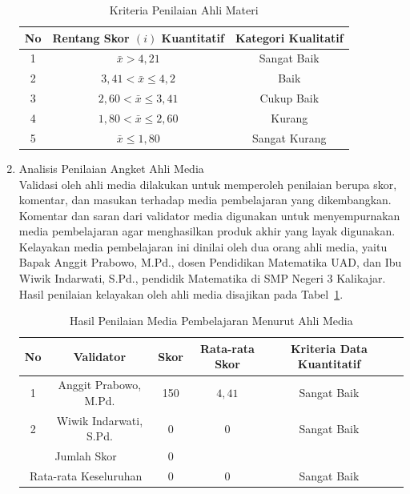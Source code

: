 \documentclass[12pt]{article}
\begin{document}
\begin{enumerate}
    \begin{table}[H]
        \centering
        \caption{Kriteria Penilaian Ahli Materi}
        \begin{tabular}{|c|c|c|}
            \hline
            \textbf{No} & \textbf{Rentang Skor \( (i) \) Kuantitatif} & \textbf{Kategori Kualitatif}\\
            \hline
            1 & \( \bar{x} > 4{,}21 \) & Sangat Baik\\
            2 & \( 3{,}41 < \bar{x} \leq 4{,}2 \) & Baik\\
            3 & \( 2{,}60 < \bar{x} \leq 3{,}41 \) & Cukup Baik\\
            4 & \( 1{,}80 < \bar{x} \leq 2{,}60 \) & Kurang\\
            5 & \( \bar{x} \leq 1{,80} \) & Sangat Kurang\\
            \hline 
        \end{tabular}
    \end{table}

    \item Analisis Penilaian Angket Ahli Media\\
    \hspace*{1cm}Validasi oleh ahli media dilakukan untuk memperoleh penilaian berupa skor, komentar, dan masukan terhadap media pembelajaran yang dikembangkan. Komentar dan saran dari validator media digunakan untuk menyempurnakan media pembelajaran agar menghasilkan produk akhir yang layak digunakan. Kelayakan media pembelajaran ini dinilai oleh dua orang ahli media, yaitu Bapak Anggit Prabowo, M.Pd., dosen Pendidikan Matematika UAD, dan Ibu Wiwik Indarwati, S.Pd., pendidik Matematika di SMP Negeri 3 Kalikajar. Hasil penilaian kelayakan oleh ahli media disajikan pada Tabel~\ref{penilaianmedia}.
    \begin{table}[H]
        \begin{adjustwidth}{-2cm}{-2cm}
            \centering
            \caption{Hasil Penilaian Media Pembelajaran Menurut Ahli Media}
            \label{penilaianmedia}
            \begin{tabular}{|c|c|c|c|c|c|}
                \hline
                \textbf{No} & \textbf{Validator} & \textbf{Skor} & \textbf{Rata-rata Skor} & \textbf{Kriteria Data Kuantitatif}\\
                \hline
                1 & Anggit Prabowo, M.Pd. & 150 & \( 4{,}41 \) & Sangat Baik\\
                2 & Wiwik Indarwati, S.Pd. & 0 & 0 & Sangat Baik\\
                \hline
                \multicolumn{2}{|c|}{Jumlah Skor} & 0 & & \\
                \hline
                \multicolumn{2}{|c|}{Rata-rata Keseluruhan} & 0 & 0 & Sangat Baik\\
                \hline
            \end{tabular}
        \end{adjustwidth}
    \end{table}


\end{enumerate}
\end{document}
